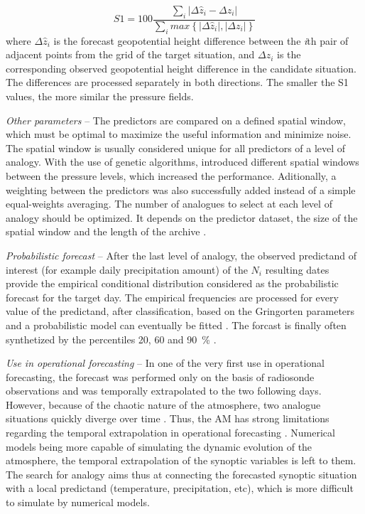 \documentclass[review]{elsarticle}
\begin{document}
\begin{equation}
\label{eq:S1}
S1=100 \frac {\displaystyle \sum_{i} \vert \Delta\hat{z}_{i} - \Delta z_{i} \vert}
{\displaystyle \sum_{i} max\left\lbrace \vert \Delta\hat{z}_{i} \vert , \vert \Delta z_{i} \vert \right\rbrace }
\end{equation}
where $\Delta \hat{z}_{i}$ is the forecast geopotential height difference between the \textit{i}th pair of adjacent points from the grid of the target situation, and $\Delta z_{i}$ is the corresponding observed geopotential height difference in the candidate situation. The differences are processed separately in both directions. The smaller the S1 values, the more similar the pressure fields.

\textit{Other parameters} -- The predictors are compared on a defined spatial window, which must be optimal to maximize the useful information and minimize noise. The spatial window is usually considered unique for all predictors of a level of analogy. With the use of genetic algorithms, \citet{Horton2018a} introduced different spatial windows between the pressure levels, which increased the performance. Aditionally, a weighting between the predictors was also successfully added instead of a simple equal-weights averaging. The number of analogues to select at each level of analogy should be optimized. It depends on the predictor dataset, the size of the spatial window and the length of the archive \citet{Ruosteenoja1988, Vandendool1994}.

\textit{Probabilistic forecast} -- After the last level of analogy, the observed predictand of interest (for example daily precipitation amount) of the $N_{i}$ resulting dates provide the empirical conditional distribution considered as the probabilistic forecast for the target day. The empirical frequencies are processed for every value of the predictand, after classification, based on the Gringorten parameters \cite[for a Gumbel or exponential law; see][]{Gringorten1963} and a probabilistic model can eventually be fitted \citep[e.g. Gamma function,][]{Obled2002}. The forcast is finally often synthetized by the percentiles 20, 60 and 90~\% \citep{Guilbaud1997, Guilbaud1998}.

\textit{Use in operational forecasting} -- In one of the very first use in operational forecasting, the forecast was performed only on the basis of radiosonde observations and was temporally extrapolated to the two following days. However, because of the chaotic nature of the atmosphere, two analogue situations quickly diverge over time \citep{Lorenz1969}. Thus, the AM has strong limitations regarding the temporal extrapolation in operational forecasting \citep{Bontron2004}. Numerical models being more capable of simulating the dynamic evolution of the atmosphere, the temporal extrapolation of the synoptic variables is left to them. The search for analogy aims thus at connecting the forecasted synoptic situation with a local predictand (temperature, precipitation, etc), which is more difficult to simulate by numerical models.
\end{document}
